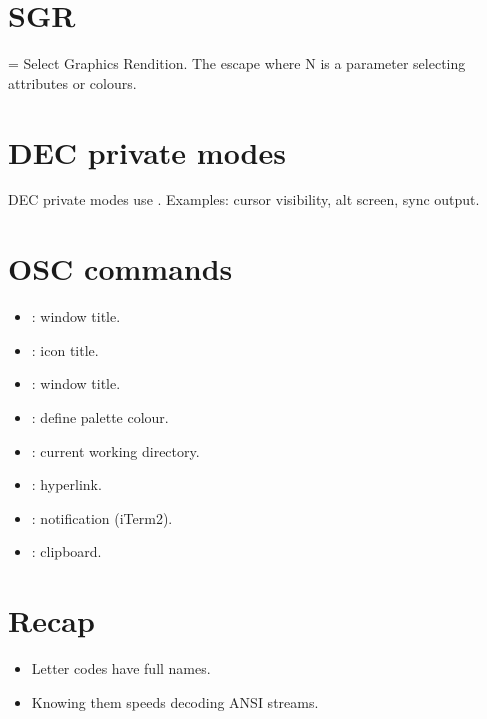 \section{SGR}

 = Select Graphics Rendition. The escape
\code{ESC [ N m} where N is a parameter selecting
attributes or colours.

\section{DEC private modes}

DEC private modes use \code{ESC [ ? N h/l}. Examples:
 cursor visibility,  alt screen,
 sync output.

\section{OSC commands}

\begin{itemize}[leftmargin=*]
  \item {}: window title.
  \item {}: icon title.
  \item {}: window title.
  \item {}: define palette colour.
  \item {}: current working directory.
  \item {}: hyperlink.
  \item {}: notification (iTerm2).
  \item {}: clipboard.
\end{itemize}

\section{Recap}

\begin{recap}
\begin{itemize}[leftmargin=*]
  \item Letter codes have full names.
  \item Knowing them speeds decoding ANSI streams.
\end{itemize}
\end{recap}
